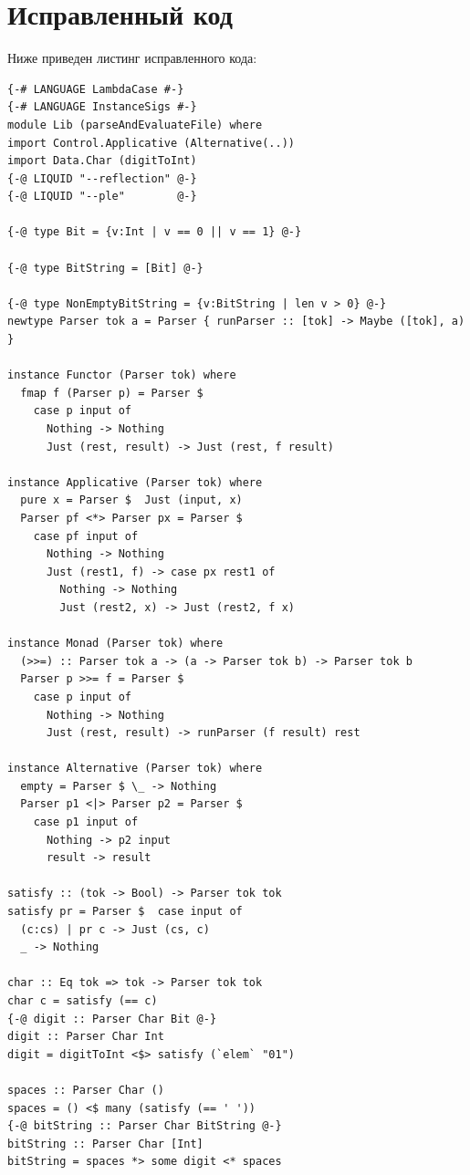 \documentclass[areasetadvanced]{scrartcl}
\begin{document}
\section{Исправленный код}
Ниже приведен листинг исправленного кода:
\begin{lstlisting}[caption={Исправленный код}, label=lst:main]
    {-# LANGUAGE LambdaCase #-}
{-# LANGUAGE InstanceSigs #-}
module Lib (parseAndEvaluateFile) where
import Control.Applicative (Alternative(..))
import Data.Char (digitToInt)
{-@ LIQUID "--reflection" @-}
{-@ LIQUID "--ple"        @-}

{-@ type Bit = {v:Int | v == 0 || v == 1} @-}

{-@ type BitString = [Bit] @-}

{-@ type NonEmptyBitString = {v:BitString | len v > 0} @-}
newtype Parser tok a = Parser { runParser :: [tok] -> Maybe ([tok], a) }

instance Functor (Parser tok) where
  fmap f (Parser p) = Parser $ 
    case p input of
      Nothing -> Nothing
      Just (rest, result) -> Just (rest, f result)

instance Applicative (Parser tok) where
  pure x = Parser $  Just (input, x)
  Parser pf <*> Parser px = Parser $ 
    case pf input of
      Nothing -> Nothing
      Just (rest1, f) -> case px rest1 of
        Nothing -> Nothing
        Just (rest2, x) -> Just (rest2, f x)

instance Monad (Parser tok) where
  (>>=) :: Parser tok a -> (a -> Parser tok b) -> Parser tok b
  Parser p >>= f = Parser $ 
    case p input of
      Nothing -> Nothing
      Just (rest, result) -> runParser (f result) rest

instance Alternative (Parser tok) where
  empty = Parser $ \_ -> Nothing
  Parser p1 <|> Parser p2 = Parser $ 
    case p1 input of
      Nothing -> p2 input
      result -> result

satisfy :: (tok -> Bool) -> Parser tok tok
satisfy pr = Parser $  case input of
  (c:cs) | pr c -> Just (cs, c)
  _ -> Nothing

char :: Eq tok => tok -> Parser tok tok
char c = satisfy (== c)
{-@ digit :: Parser Char Bit @-}
digit :: Parser Char Int
digit = digitToInt <$> satisfy (`elem` "01")

spaces :: Parser Char ()
spaces = () <$ many (satisfy (== ' '))
{-@ bitString :: Parser Char BitString @-}
bitString :: Parser Char [Int]
bitString = spaces *> some digit <* spaces


\end{lstlisting}
\end{document}
